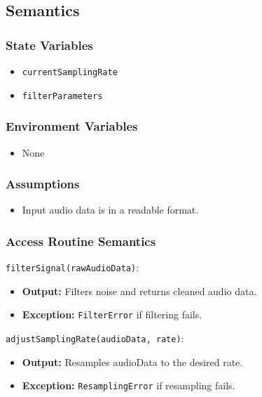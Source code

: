 \documentclass[12pt, titlepage]{article}
\begin{document}
\subsection{Semantics}  

\subsubsection{State Variables}  
\begin{itemize}  
    \item \texttt{currentSamplingRate}  
    \item \texttt{filterParameters}  
\end{itemize}  

\subsubsection{Environment Variables}  
\begin{itemize}  
    \item None  
\end{itemize}  

\subsubsection{Assumptions}  
\begin{itemize}  
    \item Input audio data is in a readable format.  
\end{itemize}  

\subsubsection{Access Routine Semantics}  

\noindent \texttt{filterSignal(rawAudioData)}:
\begin{itemize}  
    \item \textbf{Output:} Filters noise and returns cleaned audio data.  
    \item \textbf{Exception:} \texttt{FilterError} if filtering fails.  
\end{itemize}  

\noindent \texttt{adjustSamplingRate(audioData, rate)}:
\begin{itemize}  
    \item \textbf{Output:} Resamples audioData to the desired rate.  
    \item \textbf{Exception:} \texttt{ResamplingError} if resampling fails.  
\end{itemize}  
\end{document}

